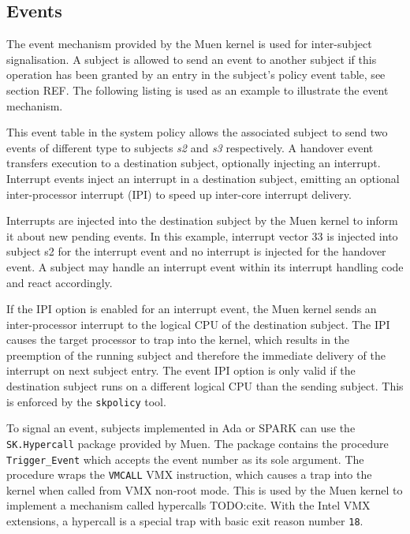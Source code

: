 \subsection{Events}\label{subsec:events}
The event mechanism provided by the Muen kernel is used for
inter-subject signalisation. A subject is allowed to send an event to another
subject if this operation has been granted by an entry in the subject's policy
event table, see section REF. The following listing is used as an example to
illustrate the event mechanism.



This event table in the system policy allows the associated subject to send two
events of different type to subjects \emph{s2} and \emph{s3} respectively. A
handover event transfers execution to a destination subject, optionally
injecting an interrupt.  Interrupt events inject an interrupt in a destination
subject, emitting an optional inter-processor interrupt (IPI) to
speed up inter-core interrupt delivery.

Interrupts are injected into the destination subject by the Muen kernel to
inform it about new pending events. In this example, interrupt vector 33 is
injected into subject s2 for the interrupt event and no interrupt is injected
for the handover event. A subject may handle an interrupt event within its
interrupt handling code and react accordingly.

If the IPI option is enabled for an interrupt event, the Muen kernel sends an
inter-processor interrupt to the logical CPU of the destination subject. The
IPI causes the target processor to trap into the kernel, which results in the
preemption of the running subject and therefore the immediate delivery of the
interrupt on next subject entry. The event IPI option is only valid if the
destination subject runs on a different logical CPU than the sending subject.
This is enforced by the \texttt{skpolicy} tool.

To signal an event, subjects implemented in Ada or SPARK can use the
\texttt{SK.Hypercall} package provided by Muen. The package contains the
procedure \texttt{Trigger\_Event} which accepts the event number as its sole
argument. The procedure wraps the \texttt{VMCALL} VMX instruction, which causes
a trap into the kernel when called from VMX non-root mode. This is used by the
Muen kernel to implement a mechanism called hypercalls TODO:cite.
With the Intel VMX extensions, a hypercall is a special trap with basic exit
reason number \texttt{18}.

